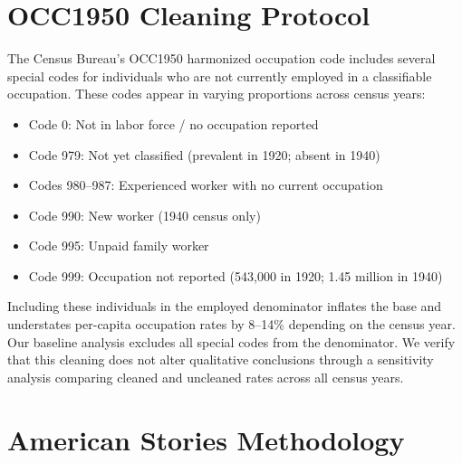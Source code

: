 \documentclass[12pt]{article}
\begin{document}
\newpage


\label{apep_main_text_end}





\appendix

\section{OCC1950 Cleaning Protocol} \label{app:occ1950}

The Census Bureau's OCC1950 harmonized occupation code includes several special codes for individuals who are not currently employed in a classifiable occupation. These codes appear in varying proportions across census years:

\begin{itemize}
  \item Code 0: Not in labor force / no occupation reported
  \item Code 979: Not yet classified (prevalent in 1920; absent in 1940)
  \item Codes 980--987: Experienced worker with no current occupation
  \item Code 990: New worker (1940 census only)
  \item Code 995: Unpaid family worker
  \item Code 999: Occupation not reported (543,000 in 1920; 1.45 million in 1940)
\end{itemize}

Including these individuals in the employed denominator inflates the base and understates per-capita occupation rates by 8--14\% depending on the census year. Our baseline analysis excludes all special codes from the denominator. We verify that this cleaning does not alter qualitative conclusions through a sensitivity analysis comparing cleaned and uncleaned rates across all census years.

\section{American Stories Methodology} \label{app:newspaper}
\end{document}
